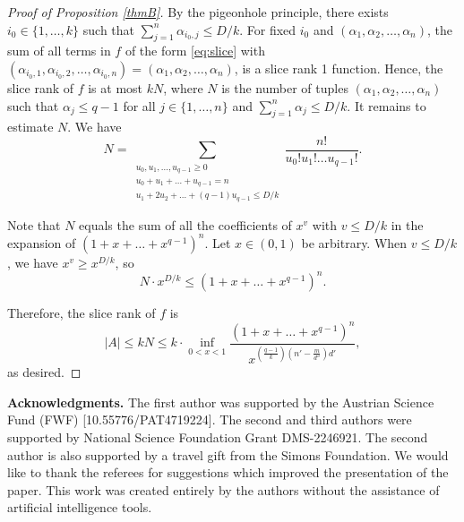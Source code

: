 \documentclass[11pt]{amsart}
\theoremstyle{definition}
\theoremstyle{remark}
\begin{document}
\begin{proof}[Proof of Proposition \ref{thmB}]
	By the pigeonhole principle, there exists $i_0 \in \{ 1, \ldots, k \}$ such that $\sum_{j=1}^{n}\alpha_{i_0,j}\leq  D/k$. 
	For fixed $i_0$ and $(\alpha_{1},\alpha_{2},\dots, \alpha_{n})$, the sum of all terms in $f$ of the form \eqref{eq:slice} with $(\alpha_{i_0, 1},\alpha_{i_0, 2},\dots, \alpha_{i_0, n})= (\alpha_{1},\alpha_{2},\dots, \alpha_{n})$, is a slice rank 1 function. Hence, the slice rank of $f$ is at most $kN$, where $N$ is the
number of tuples $(\alpha_{1},\alpha_{2},\dots, \alpha_{n})$ such that $\alpha_{j}\leq q-1  $ for all $j \in \{1, \ldots, n\}$ and $\sum_{j=1}^{n}\alpha_{j}\leq  D/k$. It remains to estimate $N$. We have
	\begin{equation*}
		N= \sum_{\substack{u_0,u_1,\dots,u_{q-1}\geq 0\\u_0+u_1+\dots+u_{q-1}=n \\ u_1+2u_2+\dots+ (q-1) u_{q-1} \leq D/k } } \frac{n!}{u_0!u_1! \dots u_{q-1}!}.
	\end{equation*}
	 
Note that	 $N$ equals the sum of all the coefficients of $x^{v}$ with $v \leq D/k$ in the expansion of $(1+x+\dots +x^{q-1})^n$. Let $x \in (0,1)$ be arbitrary. When $v \leq D/k$, we have $x^v \geq x^{D/k}$, so
\begin{equation*}
	 	N \cdot x^{D/k} \leq (1+x+\dots+x^{q-1})^n.
\end{equation*}
	 
	 Therefore, the slice rank of $f$ is
	 \begin{equation*}
	 	|A| \leq k N\leq k\cdot \inf_{0<x<1} \frac{(1+x+\dots+x^{q-1})^n}{x^{\left(\frac{q-1}{k}\right)\left(n'-\frac{m}{d''}\right)d'}},
	 \end{equation*}
as desired.	 
\end{proof}




\noindent \textbf{Acknowledgments.} 
The first author
was supported by the Austrian Science Fund (FWF) [10.55776/PAT4719224].
The second and third authors were supported by National Science Foundation Grant DMS-2246921. The second author is also supported by a travel gift from the Simons Foundation. We would like to thank the referees for suggestions which improved the presentation of the paper. This work was created entirely by the authors without the assistance of artificial intelligence tools.
\end{document}
